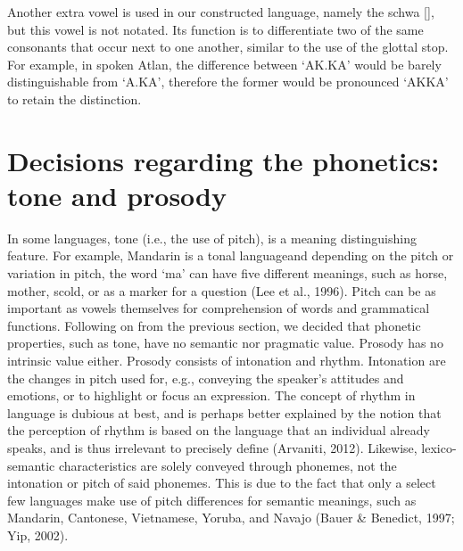 Another extra vowel is used in our constructed language, namely the schwa [\textschwa], but this vowel is not notated. Its function is to differentiate two of the same consonants that occur next to one another, similar to the use of the glottal stop. For example, in spoken Atlan, the difference between ‘AK.KA’ would be barely distinguishable from ‘A.KA’, therefore the former would be pronounced ‘AK{\textschwa}KA’ to retain the distinction. 

\section{Decisions regarding the phonetics: tone and prosody}

\noindent In some languages, tone (i.e., the use of pitch), is a meaning distinguishing feature. For example, Mandarin is a tonal languageand depending on the pitch or variation in pitch, the word ‘ma’ can have five different meanings, such as horse, mother, scold, or as a marker for a question (Lee et al., 1996). Pitch can be as important as vowels themselves for comprehension of words and grammatical functions. Following on from the previous section, we decided that phonetic properties, such as tone, have no semantic nor pragmatic value. Prosody has no intrinsic value either. Prosody consists of intonation and rhythm. Intonation are the changes in pitch used for, e.g., conveying the speaker's attitudes and emotions, or to highlight or focus an expression. The concept of rhythm in language is dubious at best, and is perhaps better explained by the notion that the perception of rhythm is based on the language that an individual already speaks, and is thus irrelevant to precisely define (Arvaniti, 2012). Likewise, lexico-semantic characteristics are solely conveyed through phonemes, not the intonation or pitch of said phonemes. This is due to the fact that only a select few languages make use of pitch differences for semantic meanings, such as Mandarin, Cantonese, Vietnamese, Yoruba, and Navajo (Bauer \& Benedict, 1997; Yip, 2002). 
  
